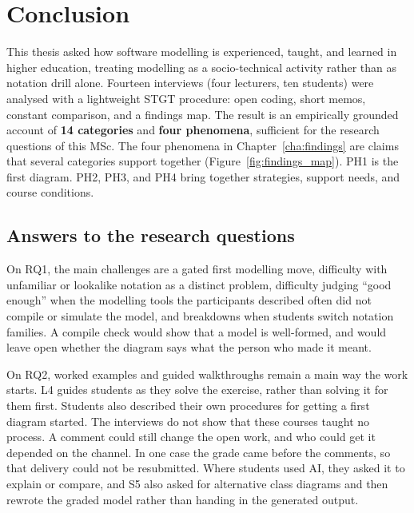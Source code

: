 
%

\chapter{Conclusion}
\label{cha:conclusion}

This thesis asked how software modelling is experienced, taught, and learned in higher education, treating modelling as a socio-technical activity rather than as notation drill alone. Fourteen interviews (four lecturers, ten students) were analysed with a lightweight STGT procedure: open coding, short memos, constant comparison, and a findings map. The result is an empirically grounded account of \textbf{14 categories} and \textbf{four phenomena}, sufficient for the research questions of this MSc. The four phenomena in Chapter~\ref{cha:findings} are claims that several categories support together (Figure~\ref{fig:findings_map}). PH1 is the first diagram. PH2, PH3, and PH4 bring together strategies, support needs, and course conditions.

\section{Answers to the research questions}
\label{sec:conc_rqs}

On RQ1, the main challenges are a gated first modelling move, difficulty with unfamiliar or lookalike notation as a distinct problem, difficulty judging ``good enough'' when the modelling tools the participants described often did not compile or simulate the model, and breakdowns when students switch notation families. A compile check would show that a model is well-formed, and would leave open whether the diagram says what the person who made it meant.

On RQ2, worked examples and guided walkthroughs remain a main way the work starts. L4 guides students as they solve the exercise, rather than solving it for them first. Students also described their own procedures for getting a first diagram started. The interviews do not show that these courses taught no process. A comment could still change the open work, and who could get it depended on the channel. In one case the grade came before the comments, so that delivery could not be resubmitted. Where students used AI, they asked it to explain or compare, and S5 also asked for alternative class diagrams and then rewrote the graded model rather than handing in the generated output.

